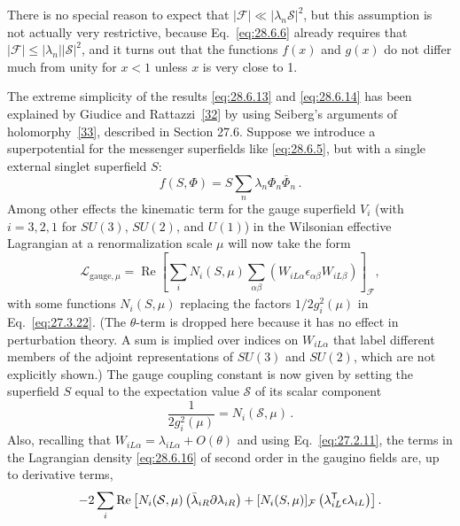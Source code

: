 There is no special reason to expect that
\(\lvert\mathcal{F}\rvert\ll
\lvert\lambda_n\mathcal{S}\rvert^2\), but this assumption is not actually
very restrictive, because Eq.~\eqref{eq:28.6.6} already requires that
\(\lvert\mathcal{F}\rvert\leq
\lvert\lambda_n\rvert\lvert\mathcal{S}\rvert^2\), and it turns out that
the functions \(f(x)\) and \(g(x)\) do not differ much from unity for
\(x<1\) unless \(x\) is very close to 1.

The extreme simplicity of the results \eqref{eq:28.6.13} and
\eqref{eq:28.6.14} has been explained by Giudice and
Rattazzi~\hyperref[ch28-ref-32]{[32]} by using Seiberg's arguments of
holomorphy~\hyperref[ch28-ref-33]{[33]}, described in Section 27.6.
Suppose we introduce a superpotential for the messenger superfields like
\eqref{eq:28.6.5}, but with a single external singlet superfield \(S\):
\begin{equation}
  f(S,\Phi)=S\sum_n\lambda_n\Phi_n\bar\Phi_n\,.
  \tag{28.6.15}\label{eq:28.6.15}
\end{equation}
Among other effects the kinematic term for the gauge superfield \(V_i\)
(with \(i=3,2,1\) for \(SU(3)\), \(SU(2)\), and \(U(1)\)) in the
Wilsonian effective Lagrangian at a renormalization scale \(\mu\) will now
take the form
\begin{equation}
  \mathcal{L}_{\mathrm{gauge},\mu}
  =\operatorname{Re}
  \left[
    \sum_iN_i(S,\mu)
    \sum_{\alpha\beta}
      \left(W_{iL\alpha}\epsilon_{\alpha\beta}W_{iL\beta}\right)
  \right]_{\mathcal{F}},
  \tag{28.6.16}\label{eq:28.6.16}
\end{equation}
with some functions \(N_i(S,\mu)\) replacing the factors
\(1/2g_i^2(\mu)\) in Eq.~\eqref{eq:27.3.22}. (The \(\theta\)-term is
dropped here because it has no effect in perturbation theory. A sum is
implied over indices on \(W_{iL\alpha}\) that label different members of
the adjoint representations of \(SU(3)\) and \(SU(2)\), which are not
explicitly shown.) The gauge coupling constant is now given by setting the
superfield \(S\) equal to the expectation value \(\mathcal{S}\) of its
scalar component
\begin{equation}
  \frac{1}{2g_i^2(\mu)}=N_i(\mathcal{S},\mu)\,.
  \tag{28.6.17}\label{eq:28.6.17}
\end{equation}
Also, recalling that \(W_{iL\alpha}=\lambda_{iL\alpha}+O(\theta)\) and
using Eq.~\eqref{eq:27.2.11}, the terms in the Lagrangian density
\eqref{eq:28.6.16} of second order in the gaugino fields are, up to
derivative terms,
\[
  -2\sum_i\operatorname{Re}
  \left[
    N_i(\mathcal{S},\mu)
      \left(\bar\lambda_{iR}\sl{\partial}\lambda_{iR}\right)
    +[N_i(S,\mu)]_{\mathcal{F}}
      \left(\lambda_{iL}^{\mathsf T}\epsilon\lambda_{iL}\right)
  \right].
\]
